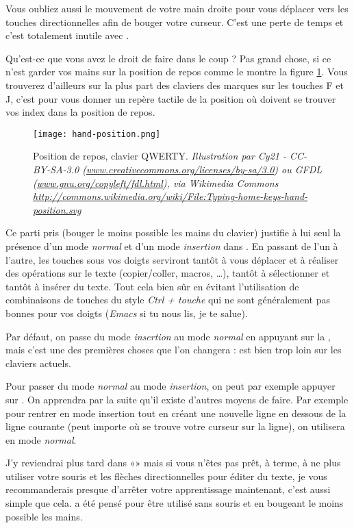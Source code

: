 Vous oubliez aussi le mouvement de votre main droite pour vous déplacer vers les touches directionnelles afin de bouger votre curseur. C'est une perte de temps et c'est totalement inutile avec \vim.

Qu'est-ce que vous avez le droit de faire dans le coup ? Pas grand chose, si ce n'est garder vos mains sur la position de repos comme le montre la figure \ref{fig:hand-position}. Vous trouverez d'ailleurs sur la plus part des claviers des marques sur les touches F et J, c'est pour vous donner un repère tactile de la position où doivent se trouver vos index dans la position de repos.

\begin{figure}%
  \texttt{[image: hand-position.png]}
  \caption{Position de repos, clavier QWERTY. \emph{Illustration par Cy21 - CC-BY-SA-3.0 (\url{www.creativecommons.org/licenses/by-sa/3.0}) ou GFDL (\url{www.gnu.org/copyleft/fdl.html}), via Wikimedia Commons \url{http://commons.wikimedia.org/wiki/File:Typing-home-keys-hand-position.svg}}}
  \label{fig:hand-position}
\end{figure}

Ce parti pris (bouger le moins possible les mains du clavier) justifie à lui seul la présence d'un mode \emph{normal} et d'un mode \emph{insertion} dans \vim. En passant de l'un à l'autre, les touches sous vos doigts serviront tantôt à vous déplacer et à réaliser des opérations sur le texte (copier/coller, macros, \ldots), tantôt à sélectionner et tantôt à insérer du texte. Tout cela bien sûr en évitant l'utilisation de combinaisons de touches du style \emph{Ctrl + touche} qui ne sont généralement pas bonnes pour vos doigts (\emph{Emacs} si tu nous lis, je te salue).

Par défaut, on passe du mode \emph{insertion} au mode \emph{normal} en appuyant sur la \ttesc, mais c'est une des premières choses que l'on changera : \ttesc est bien trop loin sur les claviers actuels. 

Pour passer du mode \emph{normal} au mode \emph{insertion}, on peut par exemple appuyer sur \tti. On apprendra par la suite qu'il existe d'autres moyens de faire. Par exemple pour rentrer en mode insertion tout en créant une nouvelle ligne en dessous de la ligne courante (peut importe où se trouve votre curseur sur la ligne), on utilisera \tto en mode \emph{normal}.

J'y reviendrai plus tard dans «» mais si vous n'êtes pas prêt, à terme, à ne plus utiliser votre souris et les flèches directionnelles pour éditer du texte, je vous recommanderais presque d'arrêter votre apprentissage maintenant, c'est aussi simple que cela. \vim a été pensé pour être utilisé sans souris et en bougeant le moins possible les mains.

